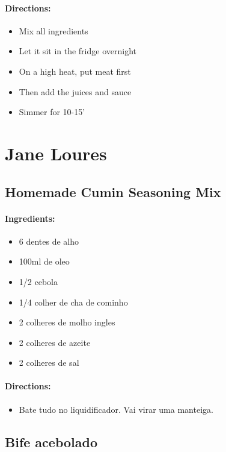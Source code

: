 \documentclass{article}
\begin{document}
\paragraph{Directions:}
\begin{itemize}
    \item Mix all ingredients
    \item Let it sit in the fridge overnight
    \item On a high heat, put meat first
    \item Then add the juices and sauce
    \item Simmer for 10-15'
\end{itemize}

\section{Jane Loures}


\subsection{Homemade Cumin Seasoning Mix}

\paragraph{Ingredients:}
\begin{itemize}
    \item 6 dentes de alho
    \item 100ml de oleo
    \item 1/2 cebola
    \item 1/4 colher de cha de cominho
    \item 2 colheres de molho ingles
    \item 2 colheres de azeite
    \item 2 colheres de sal
\end{itemize}

\paragraph{Directions:}
\begin{itemize}
    \item Bate tudo no liquidificador. Vai virar uma manteiga.
\end{itemize}

\subsection{Bife acebolado}
\end{document}
